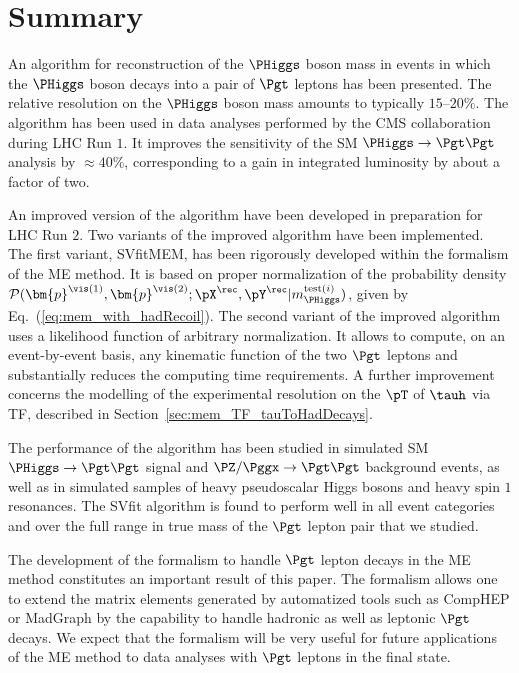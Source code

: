\section{Summary}
\label{sec:summary}

An algorithm for reconstruction of the $\PHiggs$ boson mass in events
in which the $\PHiggs$ boson decays into a pair of $\Pgt$ leptons has been
presented.
The relative resolution on the $\PHiggs$ boson mass amounts to typically
$15$--$20\%$.
The algorithm has been used in data analyses performed by the CMS
collaboration during LHC Run $1$.
It improves the sensitivity of the SM $\PHiggs \to \Pgt\Pgt$ analysis by $\approx 40\%$,
corresponding to a gain in integrated luminosity by about a factor of two.

An improved version of the algorithm have been developed in preparation
for LHC Run $2$.
Two variants of the improved algorithm have been implemented.
The first variant, SVfitMEM, has been rigorously developed within the
formalism of the ME method. It is based on proper normalization of the probability density 
$\mathcal{P}(\bm{p}^{\vis(1)},\bm{p}^{\vis(2)};\pX^{\rec},\pY^{\rec}|m_{\PHiggs}^{\textrm{test}(i)})$, given by Eq.~(\ref{eq:mem_with_hadRecoil}).
The second variant of the improved algorithm uses a likelihood
function of arbitrary normalization.
It allows to compute, on an event-by-event basis, any kinematic
function of the two $\Pgt$ leptons and substantially reduces the computing time requirements.
A further improvement concerns the modelling of the experimental
resolution on the $\pT$ of $\tauh$ via TF, described in
Section~\ref{sec:mem_TF_tauToHadDecays}.

The performance of the algorithm has been studied in simulated SM
$\PHiggs \to \Pgt\Pgt$ signal and $\PZ/\Pggx \to \Pgt\Pgt$ background
events, as well as in simulated samples of heavy pseudoscalar Higgs
bosons and heavy spin $1$ resonances.
The SVfit algorithm is found to perform well in all event
categories and over the full range in true mass of the $\Pgt$ lepton
pair that we studied.

The development of the formalism to handle $\Pgt$ lepton decays
in the ME method constitutes an important result of this paper.
The formalism allows one to extend the matrix elements generated by automatized tools such as
CompHEP or MadGraph by the capability to handle hadronic as well as leptonic $\Pgt$ decays.
We expect that the formalism will be very useful for future
applications of the ME method to data analyses with $\Pgt$ leptons in
the final state. 
